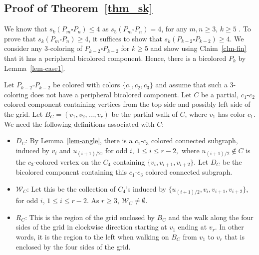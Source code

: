 \documentclass[
final, nomarks
]{dmtcs-episciences}
\begin{document}
\subsection*{ Proof of Theorem~\ref{thm_sk}}
We know that $s_k(P_m\square P_n)\leq 4$ as $s_5(P_m\square P_n)=4$, for any $m,n\geq 3$, $k\geq 5$ \cite{kirticsouglu2024coloring}. 
To prove that $s_k(P_m\square P_n)\geq 4$, 
it suffices to show that $s_k(P_{k-2}\square P_{k-2})\geq 4.$ 
We consider any 3-coloring of $P_{k-2}\square P_{k-2}$ for $k\geq 5$ and show using Claim~\ref{clm-fin} that it has a peripheral bicolored component. Hence, there is a bicolored $P_k$ by Lemma~\ref{lem-case1}. 

Let $P_{k-2}\square P_{k-2}$ be colored with colors $\{c_1,c_2,c_3\}$ and 
assume that such a 3-coloring does not have a peripheral bicolored component. 
Let $C$ be a partial, $c_1$-$c_2$ colored component containing vertices from the top side and possibly left side of the grid. 
Let $B_C= (v_1, v_2, \dots, v_r)$ be the partial walk of $C$, where $v_1$ has color $c_1$.  
We need the following definitions associated with $C$:
\begin{itemize}
    \item $D_C$: By Lemma~\ref{lem-angle}, there is a $c_1$-$c_3$ colored connected subgraph, 
    induced by $v_i$ and $u_{(i+1)/2}$, for odd $i$, $1\leq i\leq r-2,$ where $u_{(i+1)/2}\not \in C$ is the $c_3$-colored vertex on the $C_4$ containing $\{v_i, v_{i+1},v_{i+2}\}.$ Let $D_C$ be the bicolored component containing this $c_1$-$c_3$ colored connected subgraph.
    \item  $\mathcal{W}_C$: Let this be the collection of $C_4$'s induced by $\{u_{(i+1)/2}, v_i, v_{i+1},v_{i+2}\}$, for odd $i$, $1\leq i\leq r-2$. As $r\geq 3$, $\mathcal{W}_C\neq \emptyset$. 
    \item $R_C$: This is the region of the grid enclosed by $B_C$ and the walk along the four sides of the grid in clockwise direction starting at $v_1$ ending at $v_r$. In other words, it is the region to the left when walking on $B_C$ from $v_1$ to $v_r$ that is enclosed by the four sides of the grid. 
\end{itemize}
 
\end{document}
